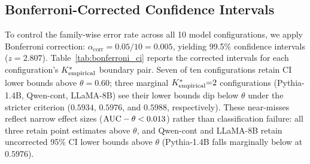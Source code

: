 \begin{table}[h]
\centering
\footnotesize
\caption{Seed robustness: $\Kempirical$ under two random seeds. 1v2 $\Delta$: change in 1v2 AUC from seed 42 to seed 123. $\Kempirical$ is stable in 2/3 configurations; the Qwen-Wiki shift to $\Kempirical{=}3$ is marginal (2v3 fold variance crosses $\theta$).}
\label{tab:seed_robustness}
\end{table}

\subsection{Bonferroni-Corrected Confidence Intervals}
\label{sec:bonferroni_ci}

To control the family-wise error rate across all 10 model configurations, we apply Bonferroni correction: $\alpha_{\text{corr}} = 0.05 / 10 = 0.005$, yielding 99.5\% confidence intervals ($z = 2.807$).
Table~\ref{tab:bonferroni_ci} reports the corrected intervals for each configuration's $\Kempirical$ boundary pair.
Seven of ten configurations retain CI lower bounds above $\theta{=}0.60$; three marginal ${K^*_{\text{empirical}}}{=}2$ configurations (Pythia-1.4B, Qwen-cont, LLaMA-8B) see their lower bounds dip below $\theta$ under the stricter criterion ($0.5934$, $0.5976$, and $0.5988$, respectively).
These near-misses reflect narrow effect sizes ($\text{AUC} - \theta < 0.013$) rather than classification failure: all three retain point estimates above $\theta$, and Qwen-cont and LLaMA-8B retain uncorrected 95\% CI lower bounds above $\theta$ (Pythia-1.4B falls marginally below at $0.5976$).

